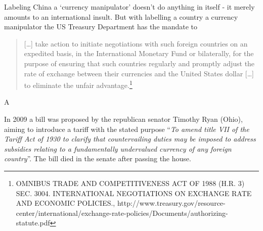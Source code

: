 Labeling China a `currency manipulator' doesn't do anything in itself - it merely amounts to an international insult. But with labelling a country a currency manipulator the US Treasury Department has the mandate to
\begin{quote}
[\dots] take action to initiate negotiations with such foreign countries on an expedited basis, in the International Monetary Fund or bilaterally, for the purpose of ensuring that such countries regularly and promptly adjust the rate of exchange between their currencies and the United States dollar [\dots] to eliminate the unfair advantage.\footnote{OMNIBUS TRADE AND COMPETITIVENESS ACT OF 1988 (H.R. 3)
SEC. 3004. INTERNATIONAL NEGOTIATIONS ON EXCHANGE RATE AND ECONOMIC POLICIES., http://www.treasury.gov/resource-center/international/exchange-rate-policies/Documents/authorizing-statute.pdf}
\end{quote}

A




In 2009 a bill was proposed by the republican senator Timothy Ryan 
(Ohio), aiming to introduce a tariff with the stated purpose 
``\textit{To amend title VII of the Tariff Act of 1930 to clarify that 
	countervailing duties may be imposed to address subsidies relating 
	to a fundamentally undervalued currency of any foreign 
country}''\cite{Ryan2009}. The bill died in the senate after passing the 
house.




